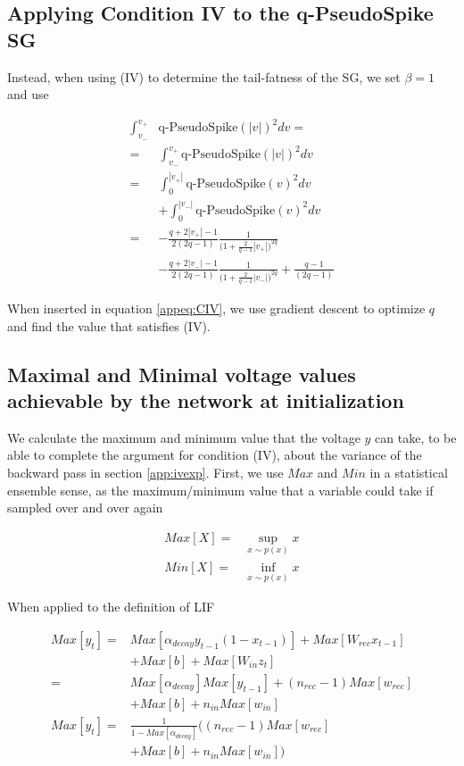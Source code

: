 \subsection{Applying Condition IV to the q-PseudoSpike SG}

Instead, when using (IV) to determine the tail-fatness of the SG, we set $\beta=1$ and use 

\begin{align}
    \int^{v_+}_{v_-} &\text{q-PseudoSpike}(|v|)^2dv=\\
    =&\int^{v_+}_{v_-} \text{q-PseudoSpike}(|v|)^2dv\\
    =& \int^{|v_+|}_0 \text{q-PseudoSpike}(v)^2dv \\
    &+ \int^{|v_-|}_0 \text{q-PseudoSpike}(v)^2dv\\
    =&- \frac{q+2|v_+|-1}{2(2q-1)}\frac{1}{\Big(1+\frac{2}{q-1}|v_+|\Big)^{2q}}\nonumber\\
    &- \frac{q+2|v_-|-1}{2(2q-1)}\frac{1}{\Big(1+\frac{2}{q-1}|v_-|\Big)^{2q}}+\frac{q-1}{(2q-1)} \label{eq:IVtail}
\end{align}

When inserted in equation \ref{appeq:CIV}, we use gradient descent to optimize $q$ and find the value that satisfies (IV).



\subsection{Maximal and Minimal voltage values achievable by the network at initialization}
\label{sec:maxminy}

We calculate the maximum and minimum value that the voltage $y$ can take, to be able to complete the argument for condition (IV), about the variance of the backward pass in section \ref{app:ivexp}.
First, we use $Max$ and $Min$ in a statistical ensemble sense, as the maximum/minimum value that a variable could take if sampled over and over again

\begin{align}
    Max[X] =& \sup_{x\sim p(x)} x \\
    Min[X] =& \inf_{x\sim p(x)} x 
\end{align}

When applied to the definition of LIF


\begin{align}
    Max[y_t] =& Max[\alpha_{decay} y_{t-1}(1-x_{t-1})] + Max[W_{rec}x_{t-1}] \nonumber \\&+ Max[b] + Max[W_{in}z_t]  \\
    =& Max[\alpha_{decay}]Max[ y_{t-1}] + (n_{rec}-1)Max[w_{rec}] \nonumber \\&+ Max[b] + n_{in}Max[w_{in}] \label{eq:allfire}\\
    Max[y_t] =& \frac{1}{1-Max[\alpha_{decay}]}\Big((n_{rec}-1)Max[w_{rec}] \nonumber \\&+ Max[b] + n_{in}Max[w_{in}]\Big) \label{eq:nonefire}
\end{align}

